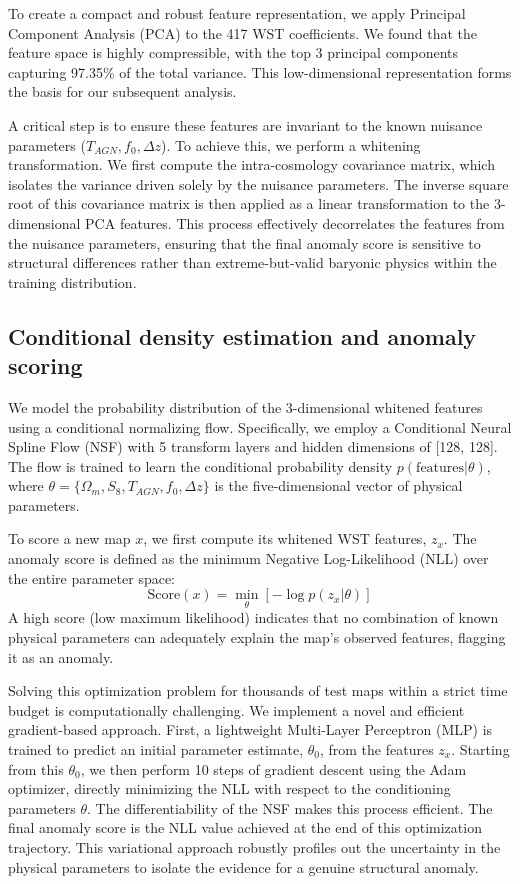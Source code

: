 \documentclass[]{article}
\begin{document}
To create a compact and robust feature representation, we apply Principal Component Analysis (PCA) to the 417 WST coefficients. We found that the feature space is highly compressible, with the top 3 principal components capturing 97.35\% of the total variance. This low-dimensional representation forms the basis for our subsequent analysis.

A critical step is to ensure these features are invariant to the known nuisance parameters ($T_{AGN}, f_0, \Delta z$). To achieve this, we perform a whitening transformation. We first compute the intra-cosmology covariance matrix, which isolates the variance driven solely by the nuisance parameters. The inverse square root of this covariance matrix is then applied as a linear transformation to the 3-dimensional PCA features. This process effectively decorrelates the features from the nuisance parameters, ensuring that the final anomaly score is sensitive to structural differences rather than extreme-but-valid baryonic physics within the training distribution.

\subsection{Conditional density estimation and anomaly scoring}
We model the probability distribution of the 3-dimensional whitened features using a conditional normalizing flow. Specifically, we employ a Conditional Neural Spline Flow (NSF) with 5 transform layers and hidden dimensions of [128, 128]. The flow is trained to learn the conditional probability density $p(\text{features} | \theta)$, where $\theta = \{\Omega_m, S_8, T_{AGN}, f_0, \Delta z\}$ is the five-dimensional vector of physical parameters.

To score a new map $x$, we first compute its whitened WST features, $z_x$. The anomaly score is defined as the minimum Negative Log-Likelihood (NLL) over the entire parameter space:
\begin{equation}
    \text{Score}(x) = \min_{\theta} \left[ -\log p(z_x | \theta) \right]
\end{equation}
A high score (low maximum likelihood) indicates that no combination of known physical parameters can adequately explain the map's observed features, flagging it as an anomaly.

Solving this optimization problem for thousands of test maps within a strict time budget is computationally challenging. We implement a novel and efficient gradient-based approach. First, a lightweight Multi-Layer Perceptron (MLP) is trained to predict an initial parameter estimate, $\theta_0$, from the features $z_x$. Starting from this $\theta_0$, we then perform 10 steps of gradient descent using the Adam optimizer, directly minimizing the NLL with respect to the conditioning parameters $\theta$. The differentiability of the NSF makes this process efficient. The final anomaly score is the NLL value achieved at the end of this optimization trajectory. This variational approach robustly profiles out the uncertainty in the physical parameters to isolate the evidence for a genuine structural anomaly.
\end{document}
